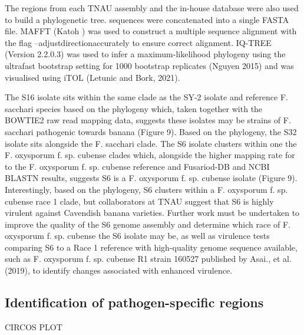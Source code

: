 The \Tef regions from each TNAU assembly and the in-house \Tef database were also used to build a phylogenetic tree. \Tef sequences were concatenated into a single FASTA file. MAFFT (Katoh ) was used to construct a multiple sequence alignment with the flag --adjustdirectionaccurately to ensure correct alignment. IQ-TREE (Version 2.2.0.3) was used to infer a maximum-likelihood phylogeny using the ultrafast bootstrap setting for 1000 bootstrap replicates (Nguyen  2015) and was visualised using iTOL (Letunic and Bork, 2021).  

The S16 isolate sits within the same clade as the SY-2 isolate and reference F. sacchari species based on the \Tef phylogeny which, taken together with the BOWTIE2 raw read mapping data, suggests these isolates may be strains of F. sacchari pathogenic towards banana (Figure 9). Based on the \Tef phylogeny, the S32 isolate sits alongside the F. sacchari clade. The S6 isolate clusters within one the F. oxysporum f. sp. cubense clades which, alongside the higher mapping rate for to the F. oxysporum f. sp. cubense reference and Fusariod-DB and NCBI BLASTN results, suggests S6  is a F. oxysporum f. sp. cubense isolate (Figure 9). Interestingly, based on the \Tef phylogeny, S6 clusters within a F. oxysporum f. sp. cubense race 1 clade, but collaborators at TNAU suggest that S6 is highly virulent against Cavendish banana varieties. Further work must be undertaken to improve the quality of the S6 genome assembly and determine which race of F. oxysporum f. sp. cubense the S6 isolate may be, as well as virulence tests comparing S6 to a Race 1 reference with high-quality genome sequence available, such as F. oxysporum f. sp. cubense R1 strain 160527 published by Asai., et al. (2019), to identify changes associated with enhanced virulence.


\subsection{Identification of pathogen-specific regions}
CIRCOS PLOT

